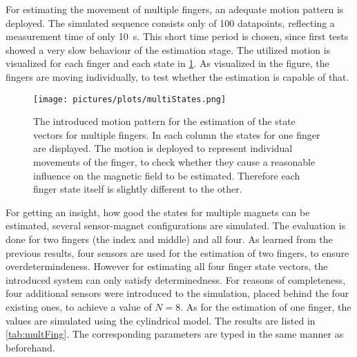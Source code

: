 For estimating the movement of multiple fingers, an adequate motion pattern is deployed. The simulated sequence consists only of 100 datapoints, reflecting a measurement time of only \SI{10}{\second}. This short time period is chosen, since first tests showed a very slow behaviour of the estimation stage. The utilized motion is visualized for each finger and each state in \ref{fig:multiFing}. As visualized in the figure, the fingers are moving individually, to test whether the estimation is capable of that.\\
\begin{figure}[!htb]
\centering
\texttt{[image: pictures/plots/multiStates.png]}
\caption[Introduced movement pattern for four finger estimation]
{The introduced motion pattern for the estimation of the state vectors for multiple fingers. In each column the states for one finger are displayed. The motion is deployed to represent individual movements of the finger, to check whether they cause a reasonable influence on the magnetic field to be estimated. Therefore each finger state itself is slightly different to the other.}
\label{fig:multiFing}
\end{figure}
For getting an insight, how good the states for multiple magnets can be estimated, several sensor-magnet configurations are simulated. The evaluation is done for two fingers (the index and middle) and all four. As learned from the previous results, four sensors are used for the estimation of two fingers, to ensure overdetermindeness. However for estimating all four finger state vectors, the introduced system can only satisfy determinedness. For reasons of completeness, four additional sensors were introduced to the simulation, placed behind the four existing ones, to achieve a value of $ N = 8 $. As for the estimation of one finger, the values are simulated using the cylindrical model. The results are listed in \ref{tab:multFing}. The corresponding parameters are typed in the same manner as beforehand.\\
